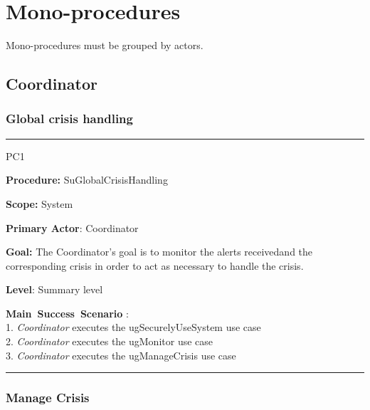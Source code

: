 \section{Mono-procedures}
Mono-procedures must be grouped by actors.


\subsection{Coordinator}

\subsubsection{Global crisis handling}
\vspace{0.5cm}
\hrule
\begin{lyxlist}{PC1}
\small{
\item [\textbf{Procedure:}] SuGlobalCrisisHandling
\item [\textbf{Scope:}] System
\item [\textbf{Primary Actor}:] Coordinator
\item [\textbf{Goal:}] The Coordinator’s goal is to monitor the alerts
receivedand the corresponding crisis in order to act as necessary to handle the
crisis.
\item [\textbf{Level}:] Summary level
\item [\textbf{Main~Success~Scenario}]:\\
1. \emph{Coordinator} executes the ugSecurelyUseSystem use case\\
2. \emph{Coordinator} executes the ugMonitor use case\\
3. \emph{Coordinator} executes the ugManageCrisis use case\\

}

\end{lyxlist}
\hrule
\vspace{0.5cm}

\subsubsection{Manage Crisis}

